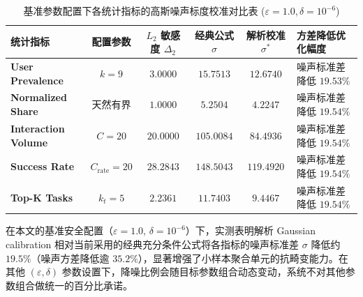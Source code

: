 \begin{table}[htbp]
\centering
\small
\caption{基准参数配置下各统计指标的高斯噪声标度校准对比表 ($\varepsilon=1.0, \delta=10^{-6}$)}
\label{tab:sigma_comparison}
\begin{tabularx}{\textwidth}{lccccX}
\toprule
\textbf{统计指标} & \textbf{配置参数} & \textbf{$L_2$ 敏感度 $\Delta_2$} & \textbf{经典公式 $\sigma$} & \textbf{解析校准 $\sigma^*$} & \textbf{方差降低优化幅度} \\
\midrule
\textbf{User Prevalence} & $k = 9$ & $3.0000$ & $15.7513$ & $\mathbf{12.6740}$ & 噪声标准差降低 $19.53\%$ \\
\textbf{Normalized Share} & 天然有界 & $1.0000$ & $5.2504$ & $\mathbf{4.2247}$ & 噪声标准差降低 $19.54\%$ \\
\textbf{Interaction Volume} & $C = 20$ & $20.0000$ & $105.0084$ & $\mathbf{84.4936}$ & 噪声标准差降低 $19.54\%$ \\
\textbf{Success Rate} & $C_{\text{rate}} = 20$ & $28.2843$ & $148.5043$ & $\mathbf{119.4920}$ & 噪声标准差降低 $19.54\%$ \\
\textbf{Top-K Tasks} & $k_t = 5$ & $2.2361$ & $11.7403$ & $\mathbf{9.4467}$ & 噪声标准差降低 $19.54\%$ \\
\bottomrule
\end{tabularx}
\end{table}

在本文的基准安全配置（$\varepsilon = 1.0, \, \delta = 10^{-6}$）下，实测表明解析 Gaussian calibration 相对当前采用的经典充分条件公式将各指标的噪声标准差 $\sigma$ 降低约 $19.5\%$（噪声方差降低逾 $35.2\%$），显著增强了小样本聚合单元的抗畸变能力。在其他 $(\varepsilon, \delta)$ 参数设置下，降噪比例会随目标参数组合动态变动，系统不对其他参数组合做统一的百分比承诺。
